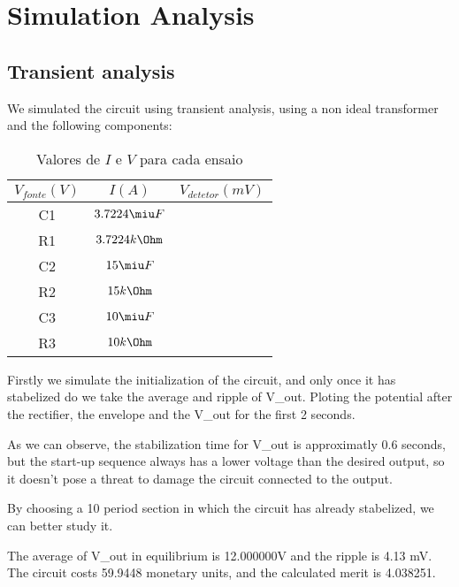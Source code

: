 \section{Simulation Analysis}
\label{sec:simulation}

\subsection{Transient analysis}

We simulated the circuit using transient analysis, using a non ideal transformer and the following components:

\begin{table}[H]
\addtolength{\tabcolsep}{-4pt}
\caption{Valores de $I$ e $V$ para cada ensaio}
\vspace{-3mm}
\begin{tabular}{|c|c|c|}
\hline
$V_{fonte} (V)$&$I (A)$&$V_{detetor} (mV)$ \\
\hline
C1 & $3.7224\miu F$ \\
R1 & $3.7224k\Ohm$ \\
C2 & $15\miu F$ \\
R2 & $15k\Ohm$ \\
C3 & $10\miu F$ \\
R3 & $10k\Ohm$ \\
\hline
\end{tabular}
\label{tab:Components}
\end{table}

\par

Firstly we simulate the initialization of the circuit, and only once it has stabelized do we take the average and ripple of V_{out}. Ploting the potential after the rectifier, the envelope and the V_{out} for the first 2 seconds.


As we can observe, the stabilization time for V_{out} is approximatly 0.6 seconds, but the start-up sequence always has a lower voltage than the desired output, so it doesn't pose a threat to damage the circuit connected to the output.

\par

By choosing a 10 period section in which the circuit has already stabelized, we can better study it.

    
The average of V_{out} in equilibrium is 12.000000V and the ripple is 4.13 mV. The circuit costs 59.9448 monetary units, and the calculated merit is 4.038251.

